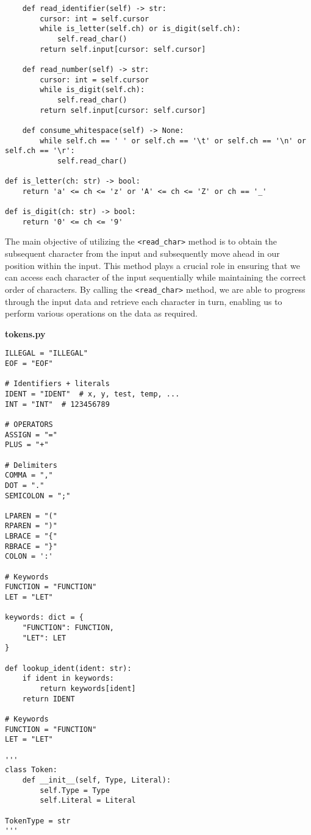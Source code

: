 \begin{lstlisting}
    def read_identifier(self) -> str:
        cursor: int = self.cursor
        while is_letter(self.ch) or is_digit(self.ch):
            self.read_char()
        return self.input[cursor: self.cursor]

    def read_number(self) -> str:
        cursor: int = self.cursor
        while is_digit(self.ch):
            self.read_char()
        return self.input[cursor: self.cursor]

    def consume_whitespace(self) -> None:
        while self.ch == ' ' or self.ch == '\t' or self.ch == '\n' or self.ch == '\r':
            self.read_char()

def is_letter(ch: str) -> bool:
    return 'a' <= ch <= 'z' or 'A' <= ch <= 'Z' or ch == '_'

def is_digit(ch: str) -> bool:
    return '0' <= ch <= '9'
\end{lstlisting}

The main objective of utilizing the \texttt{<read\_char>} method is to obtain the subsequent character from the input and subsequently 
    move ahead in our position within the input. This method plays a crucial role in ensuring that we can access each character 
    of the input sequentially while maintaining the correct order of characters. By calling the \texttt{<read\_char>} method, we are able 
    to progress through the input data and retrieve each character in turn, enabling us to perform various operations on the 
    data as required.

\textbf{tokens.py}

\begin{lstlisting}
ILLEGAL = "ILLEGAL"
EOF = "EOF"

# Identifiers + literals
IDENT = "IDENT"  # x, y, test, temp, ...
INT = "INT"  # 123456789

# OPERATORS
ASSIGN = "="
PLUS = "+"

# Delimiters
COMMA = ","
DOT = "."
SEMICOLON = ";"

LPAREN = "("
RPAREN = ")"
LBRACE = "{"
RBRACE = "}"
COLON = ':'

# Keywords
FUNCTION = "FUNCTION"
LET = "LET"

keywords: dict = {
    "FUNCTION": FUNCTION,
    "LET": LET
}

def lookup_ident(ident: str):
    if ident in keywords:
        return keywords[ident]
    return IDENT

# Keywords
FUNCTION = "FUNCTION"
LET = "LET"

'''
class Token:
    def __init__(self, Type, Literal):
        self.Type = Type
        self.Literal = Literal

TokenType = str
'''
\end{lstlisting}

